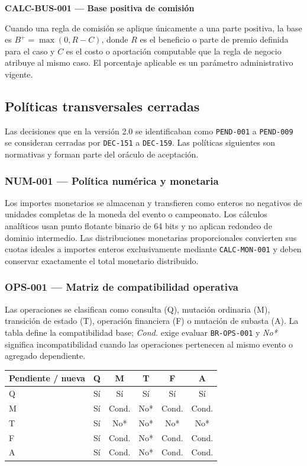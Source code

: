 \documentclass[10pt,letterpaper]{article}
\begin{document}
\noindent\textbf{CALC-BUS-001 --- Base positiva de comisión}\par
Cuando una regla de comisión se aplique únicamente a una parte positiva, la base es $B^+=\max(0,R-C)$, donde $R$ es el beneficio o parte de premio definida para el caso y $C$ es el costo o aportación computable que la regla de negocio atribuye al mismo caso. El porcentaje aplicable es un parámetro administrativo vigente.\par\vspace{0.5em}
\subsection{Políticas transversales cerradas}
Las decisiones que en la versión 2.0 se identificaban como \texttt{PEND-001} a \texttt{PEND-009} se consideran cerradas por \texttt{DEC-151} a \texttt{DEC-159}. Las políticas siguientes son normativas y forman parte del oráculo de aceptación.

\subsubsection{NUM-001 --- Política numérica y monetaria}
Los importes monetarios se almacenan y transfieren como enteros no negativos de unidades completas de la moneda del evento o campeonato. Los cálculos analíticos usan punto flotante binario de 64 bits y no aplican redondeo de dominio intermedio. Las distribuciones monetarias proporcionales convierten sus cuotas ideales a importes enteros exclusivamente mediante \texttt{CALC-MON-001} y deben conservar exactamente el total monetario distribuido.

\subsubsection{OPS-001 --- Matriz de compatibilidad operativa}
Las operaciones se clasifican como consulta (Q), mutación ordinaria (M), transición de estado (T), operación financiera (F) o mutación de subasta (A). La tabla define la compatibilidad base; \emph{Cond.} exige evaluar \texttt{BR-OPS-001} y \emph{No*} significa incompatibilidad cuando las operaciones pertenecen al mismo evento o agregado dependiente.
\begin{center}
\begin{tabular}{lccccc}
\toprule
\textbf{Pendiente / nueva} & Q & M & T & F & A\\
\midrule
Q & Sí & Sí & Sí & Sí & Sí\\
M & Sí & Cond. & No* & Cond. & Cond.\\
T & Sí & No* & No* & No* & No*\\
F & Sí & Cond. & No* & Cond. & Cond.\\
A & Sí & Cond. & No* & Cond. & Cond.\\
\bottomrule
\end{tabular}
\end{center}
\end{document}
